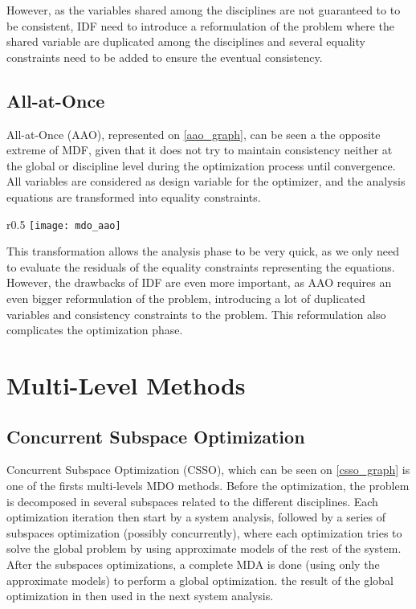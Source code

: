 However, as the variables shared among the disciplines are not guaranteed to to be consistent, IDF need to introduce a reformulation of the problem where the shared variable are duplicated among the disciplines and several equality constraints need to be added to ensure the eventual consistency.

\subsection{All-at-Once}

All-at-Once (AAO), represented on \figurename{} \ref{aao_graph}, can be seen a the opposite extreme of MDF, given that it does not try to maintain consistency neither at the global or discipline level during the optimization process until convergence.
All variables are considered as design variable for the optimizer, and the analysis equations are transformed into equality constraints.

\begin{wrapfigure}{r}{0.5\textwidth}
\centering
\texttt{[image: mdo\_aao]}
\caption{AAO method}\label{aao_graph}
\end{wrapfigure}

This transformation allows the analysis phase to be very quick, as we only need to evaluate the residuals of the equality constraints representing the equations.
However, the drawbacks of IDF are even more important, as AAO requires an even bigger reformulation of the problem, introducing a lot of duplicated variables and consistency  constraints to the problem. This reformulation also complicates the optimization phase.



\section{Multi-Level Methods}

\subsection{Concurrent Subspace Optimization}

Concurrent Subspace Optimization (CSSO), which can be seen on \figurename{} \ref{csso_graph} is one of the firsts multi-levels MDO methods. Before the optimization, the problem is decomposed in several subspaces related to the different disciplines. Each optimization iteration then start by a system analysis, followed by a series of subspaces optimization (possibly concurrently), where each optimization tries to solve the global problem by using approximate models of the rest of the system. After the subspaces optimizations, a complete MDA is done (using only the approximate models) to perform a global optimization. the result of the global optimization in then used in the next system analysis.

